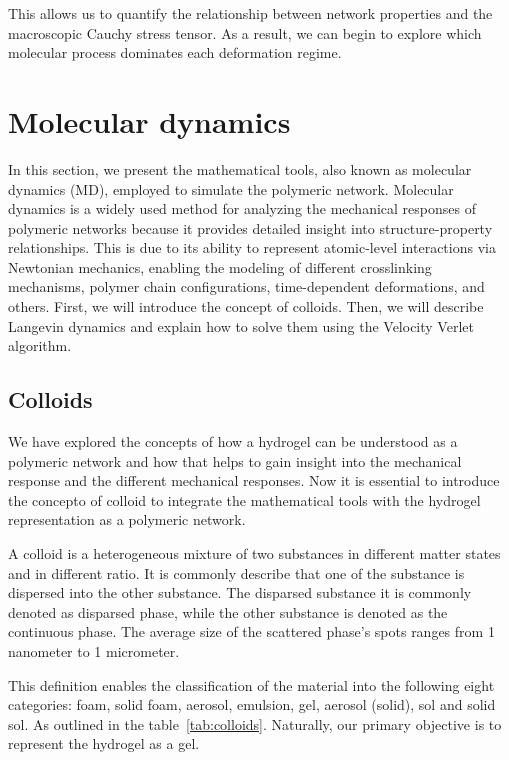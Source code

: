 This allows us to quantify the relationship between network properties and the macroscopic Cauchy stress tensor. 
As a result, we can begin to explore which molecular process dominates each deformation regime.

\section{Molecular dynamics}

In this section, we present the mathematical tools, also known as molecular dynamics (MD), employed to simulate the polymeric network.
Molecular dynamics is a widely used method for analyzing the mechanical responses of polymeric networks because it provides detailed insight into structure-property relationships.
This is due to its ability to represent atomic-level interactions via Newtonian mechanics, enabling the modeling of different crosslinking mechanisms, polymer chain configurations, time-dependent deformations, and others.
First, we will introduce the concept of colloids. 
Then, we will describe Langevin dynamics and explain how to solve them using the Velocity Verlet algorithm.

\subsection{Colloids}

We have explored the concepts of how a hydrogel can be understood as a polymeric network and how that helps to gain insight into the mechanical response and the different mechanical responses.
Now it is essential to introduce the concepto of colloid to integrate the mathematical tools with the hydrogel representation as a polymeric network.

A colloid is a heterogeneous mixture of two substances in different matter states and in different ratio\citep{castaneda-priegoColloidalSoftMatter2021}.
It is commonly describe that one of the substance is dispersed into the other substance.
The disparsed substance it is commonly denoted as disparsed phase, while the other substance is denoted as the continuous phase.
The average size of the scattered phase's spots ranges from 1 nanometer to 1 micrometer.

This definition enables the classification of the material into the following eight categories:
foam, solid foam,
aerosol, emulsion, gel,
aerosol (solid), sol and solid sol.
As outlined in the table~\ref{tab:colloids}.
Naturally, our primary objective is to represent the hydrogel as a gel.

